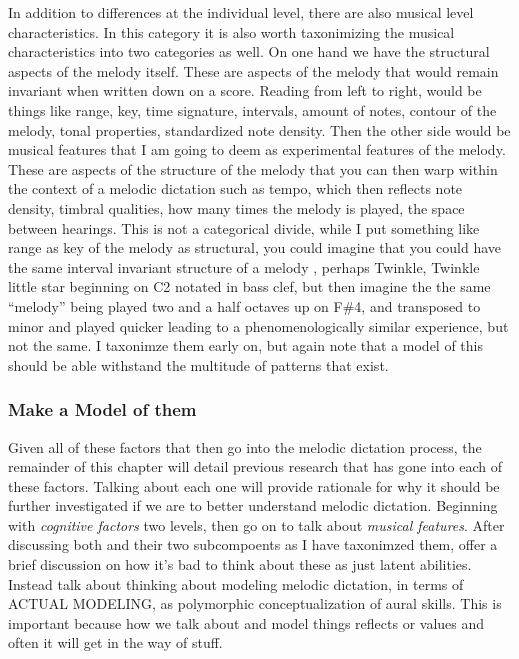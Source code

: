 \documentclass[]{book}
\theoremstyle{definition}
\theoremstyle{definition}
\theoremstyle{definition}
\theoremstyle{remark}
\begin{document}
In addition to differences at the individual level, there are also
musical level characteristics. In this category it is also worth
taxonimizing the musical characteristics into two categories as well. On
one hand we have the structural aspects of the melody itself. These are
aspects of the melody that would remain invariant when written down on a
score. Reading from left to right, would be things like range, key, time
signature, intervals, amount of notes, contour of the melody, tonal
properties, standardized note density. Then the other side would be
musical features that I am going to deem as experimental features of the
melody. These are aspects of the structure of the melody that you can
then warp within the context of a melodic dictation such as tempo, which
then reflects note density, timbral qualities, how many times the melody
is played, the space between hearings. This is not a categorical divide,
while I put something like range as key of the melody as structural, you
could imagine that you could have the same interval invariant structure
of a melody , perhaps Twinkle, Twinkle little star beginning on C2
notated in bass clef, but then imagine the the same ``melody'' being
played two and a half octaves up on F\#4, and transposed to minor and
played quicker leading to a phenomenologically similar experience, but
not the same. I taxonimze them early on, but again note that a model of
this should be able withstand the multitude of patterns that exist.

\hypertarget{make-a-model-of-them}{%
\subsubsection{Make a Model of them}\label{make-a-model-of-them}}

Given all of these factors that then go into the melodic dictation
process, the remainder of this chapter will detail previous research
that has gone into each of these factors. Talking about each one will
provide rationale for why it should be further investigated if we are to
better understand melodic dictation. Beginning with \emph{cognitive
factors} two levels, then go on to talk about \emph{musical features}.
After discussing both and their two subcompoents as I have taxonimzed
them, offer a brief discussion on how it's bad to think about these as
just latent abilities. Instead talk about thinking about modeling
melodic dictation, in terms of ACTUAL MODELING, as polymorphic
conceptualization of aural skills. This is important because how we talk
about and model things reflects or values and often it will get in the
way of stuff.
\end{document}
